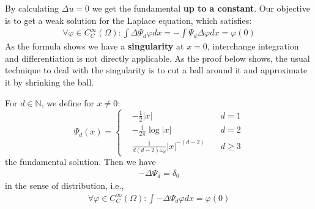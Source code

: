 By calculating $\Delta u = 0$ we get the fundamental \textbf{up to a constant}. Our objective is to get a weak solution for the Laplace equation, which satisfies:
\begin{align*}
		\forall \varphi \in C_C^\infty(\Omega): \int \Delta \Psi_d \varphi dx =   -\int \Psi_d \Delta \varphi dx = \varphi(0)	
\end{align*}
As the formula shows we have a \textbf{singularity} at $x = 0$, interchange integration and differentiation is not directly applicable. As the proof below shows, the usual technique to deal with the singularity is to cut a ball around it and approximate it by shrinking the ball. 

\begin{theorem}
 	For $d \in \mathbb{N}$, we define for $x \neq 0$: 
\begin{equation}\label{PE: fundamental solution}
	\Psi_d(x) = \left\{
	\begin{aligned}
		&-\frac{1}{2}|x| \quad &d = 1\\
		&-\frac{1}{2\pi} \log|x| \quad &d = 2\\
		& \frac{1}{d(d-2)\omega_d} |x|^{-(d-2)} \quad &d \geq3
	\end{aligned}
	\right.
\end{equation}
the fundamental solution. Then we have
\begin{align*}
	-\Delta \Psi_d = \delta_0 
\end{align*}
in the sense of distribution, i.e.,  
	\begin{align*}
		\forall \varphi \in C_C^\infty(\Omega): \int -\Delta \Psi_d \varphi dx = \varphi(0)
	\end{align*}
\end{theorem}
